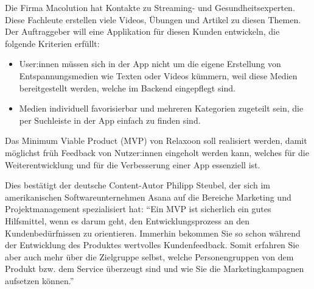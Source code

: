 
Die Firma Macolution hat Kontakte zu Streaming- und Gesundheitsexperten. Diese Fachleute erstellen viele Videos, 
Übungen und Artikel zu diesen Themen. Der Auftraggeber will eine Applikation für diesen Kunden entwickeln, die folgende
Kriterien erfüllt:

\begin{itemize}
    \item User:innen müssen sich in der App nicht um die eigene Erstellung von Entspannungsmedien wie Texten oder Videos
    kümmern, weil diese Medien bereitgestellt werden, welche im Backend eingepflegt sind.
    \item Medien
    individuell favorisierbar und mehreren Kategorien zugeteilt sein, die per Suchleiste in der App einfach zu
    finden sind.
\end{itemize}

Das Minimum Viable Product (MVP) von Relaxoon soll realisiert werden, damit möglichst früh Feedback von Nutzer:innen
eingeholt werden kann, welches für die Weiterentwicklung und für die Verbesserung einer App essenziell ist.

Dies bestätigt der deutsche Content-Autor Philipp Steubel, der sich im amerikanischen Softwareunternehmen Asana
auf die Bereiche Marketing und 
Projektmanagement spezialisiert hat: "`Ein MVP ist sicherlich ein gutes Hilfsmittel, wenn es darum geht, den 
Entwicklungsprozess an den Kundenbedürfnissen zu orientieren. Immerhin bekommen Sie so schon während der 
Entwicklung des Produktes wertvolles Kundenfeedback. Somit erfahren Sie aber auch mehr über die Zielgruppe 
selbst, welche Personengruppen von dem Produkt bzw. dem Service überzeugt sind und wie Sie die Marketingkampagnen
aufsetzen können."' \cite{mvp}






